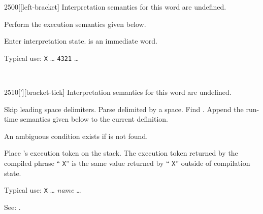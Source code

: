 \vspace*{-2ex}\enlargethispage{8ex}
\begin{worddef}{2500}{[}[left-bracket]
\interpret
	Interpretation semantics for this word are undefined.

\compile
	Perform the execution semantics given below.

\execute
	\stack{}{}

	Enter interpretation state. \word{[} is an immediate word.

	\walso{core:]}

	\begin{rationale} %
		Typical use:
			\word{:} \texttt{X} {\ldots}
				\word{[} \texttt{4321} \word{]} 
				{\ldots} \word{;}
	\end{rationale}

	\begin{testing} %
		 \\
	\end{testing}
\end{worddef}

\vspace*{-2ex}
\begin{worddef}{2510}{[']}[bracket-tick]
\interpret
	Interpretation semantics for this word are undefined.

\compile

	Skip leading space delimiters. Parse  delimited by
	a space. Find . Append the run-time semantics given
	below to the current definition.

	An ambiguous condition exists if  is not found.

\runtime

	Place 's execution token  on the stack.
	The execution token returned by the compiled phrase
	``\word{[']} \texttt{X}'' is the same value returned by
	`` \texttt{X}'' outside of compilation state.


	\begin{rationale} %
		Typical use:
			\word{:} \texttt{X} {\ldots}
				\word{[']} \emph{name}
				{\ldots} \word{;}

		See:
			.
	\end{rationale}

	\begin{testing} %
		 \\
	\end{testing}
\end{worddef}

